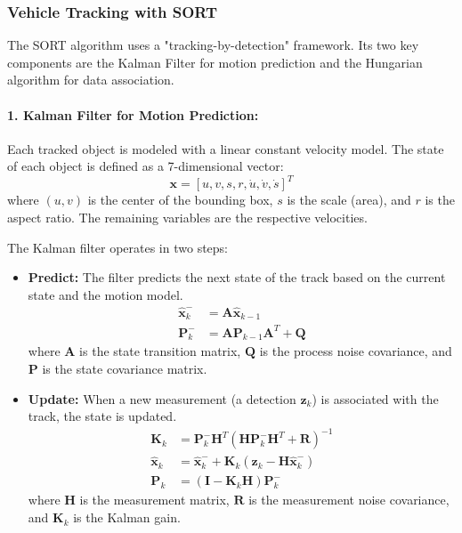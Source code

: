 \documentclass{article}
\begin{document}
\subsubsection{Vehicle Tracking with SORT}

The SORT algorithm uses a "tracking-by-detection" framework. Its two key components are the Kalman Filter for motion prediction and the Hungarian algorithm for data association.

\paragraph{1. Kalman Filter for Motion Prediction:}
Each tracked object is modeled with a linear constant velocity model. The state of each object is defined as a 7-dimensional vector:
\begin{equation}
\mathbf{x} = [u, v, s, r, \dot{u}, \dot{v}, \dot{s}]^T
\end{equation}
where $(u, v)$ is the center of the bounding box, $s$ is the scale (area), and $r$ is the aspect ratio. The remaining variables are the respective velocities.

The Kalman filter operates in two steps:
\begin{itemize}
    \item \textbf{Predict:} The filter predicts the next state of the track based on the current state and the motion model.
    \begin{align}
    \hat{\mathbf{x}}_k^- &= \mathbf{A} \hat{\mathbf{x}}_{k-1} \\
    \mathbf{P}_k^- &= \mathbf{A} \mathbf{P}_{k-1} \mathbf{A}^T + \mathbf{Q}
    \end{align}
    where $\mathbf{A}$ is the state transition matrix, $\mathbf{Q}$ is the process noise covariance, and $\mathbf{P}$ is the state covariance matrix.

    \item \textbf{Update:} When a new measurement (a detection $\mathbf{z}_k$) is associated with the track, the state is updated.
    \begin{align}
    \mathbf{K}_k &= \mathbf{P}_k^- \mathbf{H}^T (\mathbf{H} \mathbf{P}_k^- \mathbf{H}^T + \mathbf{R})^{-1} \\
    \hat{\mathbf{x}}_k &= \hat{\mathbf{x}}_k^- + \mathbf{K}_k (\mathbf{z}_k - \mathbf{H} \hat{\mathbf{x}}_k^-) \\
    \mathbf{P}_k &= (\mathbf{I} - \mathbf{K}_k \mathbf{H}) \mathbf{P}_k^-
    \end{align}
    where $\mathbf{H}$ is the measurement matrix, $\mathbf{R}$ is the measurement noise covariance, and $\mathbf{K}_k$ is the Kalman gain.
\end{itemize}
\end{document}
